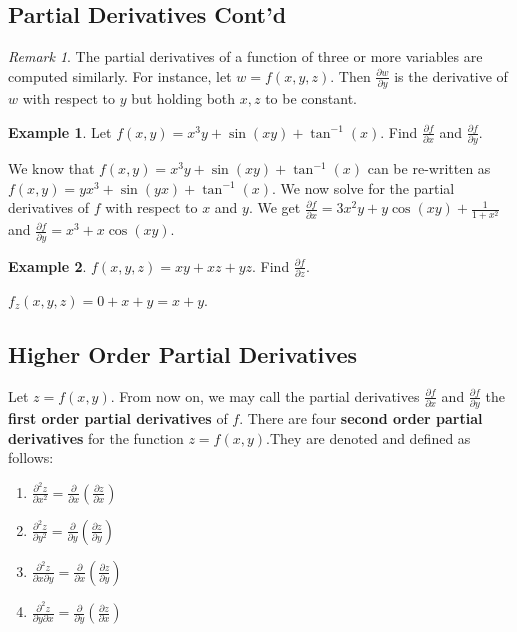 \documentclass[11pt]{article}
\theoremstyle{plain} %
\theoremstyle{definition}
\theoremstyle{example}
\newtheorem*{example}{Example}
\theoremstyle{remark}
\newtheorem*{remark}{Remark}
\begin{document}
\subsection{Partial Derivatives Cont'd}

\begin{remark}
The partial derivatives of a function of three or more variables are computed similarly. For instance, let $w=f(x, y, z)$. Then $\frac{\partial w}{\partial y}$ is the derivative of $w$ with respect to $y$ but holding both $x, z$ to be constant.
\end{remark}

\begin{example}
Let $f(x,y) = x^3y+\sin(xy)+\tan ^{-1}(x)$. Find $\frac{\partial f}{\partial x}$ and $\frac{\partial f}{\partial y}$.
\end{example}

We know that $f(x,y) = x^3y + \sin(xy)+\tan^{-1}(x)$ can be re-written as $f(x,y) = yx^3 + \sin(yx) + \tan^{-1}(x)$. We now solve for the partial derivatives of $f$ with respect to $x$ and $y$. We get $\frac{\partial f}{\partial x} = 3x^2y + y\cos(xy) + \frac{1}{1+x^2}$ and $\frac{\partial f}{\partial y} = x^3 + x\cos(xy)$.

\begin{example}
$f(x, y, z) = xy + xz + yz$. Find $\frac{\partial f}{\partial z}$.
\end{example}

$f_z(x, y, z) = 0 +x+y = x+y$.

\subsection{Higher Order Partial Derivatives}

Let $z=f(x, y)$. From now on, we may call the partial derivatives $\frac{\partial f}{\partial x}$ and $\frac{\partial f}{\partial y}$ the \textbf{first order partial derivatives} of $f$. There are four \textbf{second order partial derivatives} for the function $z=f(x,y)$.They are denoted and defined as follows:

\begin{enumerate}
	\item $\frac{\partial ^2 z}{\partial x^2} = \frac{\partial}{\partial x} \left(\frac{\partial z}{\partial x} \right)$
	\item $\frac{\partial ^2 z}{\partial y^2} = \frac{\partial}{\partial y} \left(\frac{\partial z}{\partial y} \right)$
	\item $\frac{\partial ^2 z}{\partial x \partial y} = \frac{\partial}{\partial x} \left(\frac{\partial z}{\partial y} \right)$
	\item $\frac{\partial ^2 z}{\partial y \partial x} = \frac{\partial}{\partial y} \left(\frac{\partial z}{\partial x} \right)$
\end{enumerate}
\end{document}
